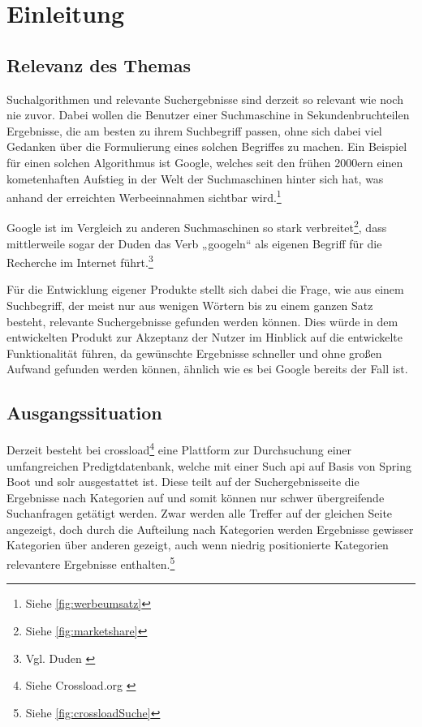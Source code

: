 \chapter{Einleitung}\label{ch:intro}

\section{Relevanz des Themas}
\label{sec:topicRelevance}
Suchalgorithmen und relevante Suchergebnisse sind derzeit so relevant wie noch nie zuvor.
Dabei wollen die Benutzer einer Suchmaschine in Sekundenbruchteilen Ergebnisse, die am besten zu ihrem Suchbegriff passen, ohne sich dabei viel Gedanken über die Formulierung eines solchen Begriffes zu machen.
Ein Beispiel für einen solchen Algorithmus ist Google, welches seit den frühen 2000ern einen kometenhaften Aufstieg in der Welt der Suchmaschinen hinter sich hat, was anhand der erreichten Werbeeinnahmen sichtbar wird.\footnote{Siehe \ref{fig:werbeumsatz}}

Google ist im Vergleich zu anderen Suchmaschinen so stark verbreitet\footnote{Siehe \ref{fig:marketshare}}, dass mittlerweile sogar der Duden das Verb „googeln“ als eigenen Begriff für die Recherche im Internet führt.\footnote{Vgl. Duden \cite{duden2022}}

Für die Entwicklung eigener Produkte stellt sich dabei die Frage, wie aus einem Suchbegriff, der meist nur aus wenigen Wörtern bis zu einem ganzen Satz besteht, relevante Suchergebnisse gefunden werden können.
Dies würde in dem entwickelten Produkt zur Akzeptanz der Nutzer im Hinblick auf die entwickelte Funktionalität führen, da gewünschte Ergebnisse schneller und ohne großen Aufwand gefunden werden können, ähnlich wie es bei Google bereits der Fall ist.

\section{Ausgangssituation}
\label{sec:currentSituation}
Derzeit besteht bei \gls{crossload}\footnote{Siehe Crossload.org \cite{pfleiderer2022}} eine Plattform zur Durchsuchung einer umfangreichen Predigtdatenbank, welche mit einer Such \gls{api} auf Basis von Spring Boot und \gls{solr} ausgestattet ist.
Diese teilt auf der Suchergebnisseite die Ergebnisse nach Kategorien auf und somit können nur schwer übergreifende Suchanfragen getätigt werden.
Zwar werden alle Treffer auf der gleichen Seite angezeigt, doch durch die Aufteilung nach Kategorien werden Ergebnisse gewisser Kategorien über anderen gezeigt, auch wenn niedrig positionierte Kategorien relevantere Ergebnisse enthalten.\footnote{Siehe \ref{fig:crossloadSuche}}

